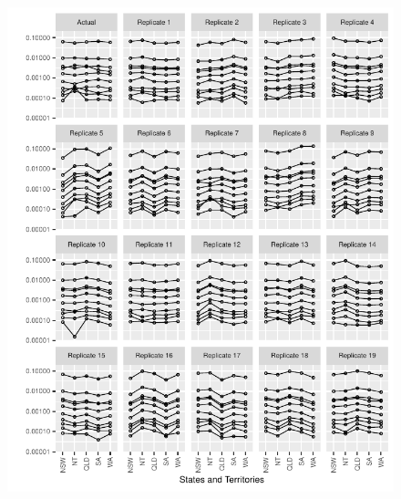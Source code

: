 \documentclass{article}
\begin{document}
\begin{figure}
  \centering
  \includegraphics{out/fig_replicate_data_Female_Non-Indigenous_Baseline}
\end{figure}
\newpage
\end{document}
